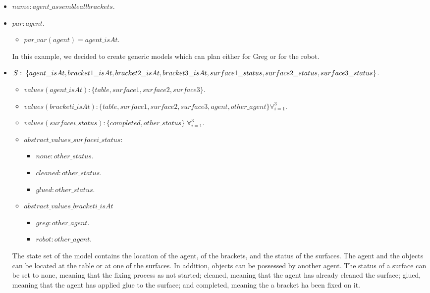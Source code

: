 \begin{itemize}
	\item $name: agent\_assembleallbrackets$.
	\item		$par: agent$.
		\begin{itemize}
			\item $par\_var(agent)=agent\_isAt$.
		\end{itemize}
		In this example, we decided to create generic models which can plan either for Greg or for the robot.
	\item $S:\;\{agent\_isAt,bracket1\_isAt,bracket2\_isAt,bracket3\_isAt,surface1\_status,\\ surface2\_status,surface3\_status\}$. 
		\begin{itemize}
			\item $values(agent\_isAt):\{table,surface1,surface2,surface3\}$.
			\item $values(bracketi\_isAt):\{table,surface1,surface2,surface3,agent,other\_agent\} \forall_{i=1}^3$. 
			\item $values(surfacei\_status):\{completed,other\_status\}\;\forall_{i=1}^3$.
		\end{itemize}
		\begin{itemize}
			\item $abstract\_values\_surfacei\_status:$ 
				\begin{itemize}
					\item $none: other\_status$.
					\item $cleaned: other\_status$.
					\item $glued: other\_status$.
				\end{itemize}
			\item $abstract\_values\_bracketi\_isAt$ 
				\begin{itemize}
					\item $greg: other\_agent$.
					\item $robot: other\_agent$.
				\end{itemize}	
		\end{itemize}
		The state set of the model contains the location of the agent, of the brackets, and the status of the surfaces. The agent and the objects can be located at the table or at one of the surfaces. In addition, objects can be possessed by another agent. The status of a surface can be set to none, meaning that the fixing process as not started; cleaned, meaning that the agent has already cleaned the surface; glued, meaning that the agent has applied glue to the surface; and completed, meaning the a bracket ha been fixed on it. 


\end{itemize}
